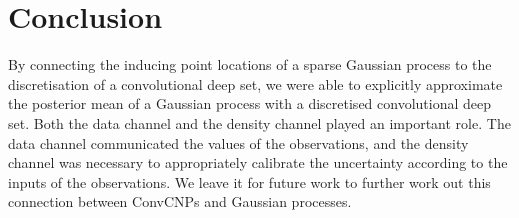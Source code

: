 \documentclass[12pt]{report}
\begin{document}
\section{Conclusion}
By connecting the inducing point locations of a sparse Gaussian process to the discretisation of a convolutional deep set,
we were able to explicitly approximate the posterior mean of a Gaussian process with a discretised convolutional deep set.
Both the data channel and the density channel played an important role.
The data channel communicated the values of the observations,
and the density channel was necessary to appropriately calibrate the uncertainty according to the inputs of the observations.
We leave it for future work to further work out this connection between ConvCNPs and Gaussian processes.
\end{document}
